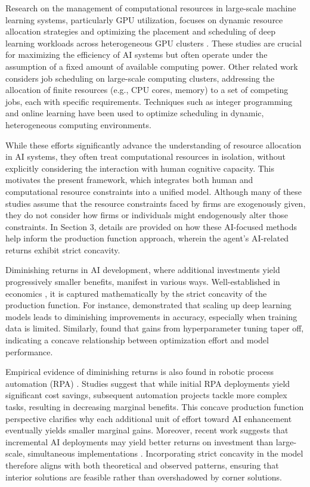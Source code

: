 \documentclass[11pt]{article}
\theoremstyle{definition}
\theoremstyle{remark}
\begin{document}
Research on the management of computational resources in large-scale machine learning systems, particularly GPU utilization, focuses on dynamic resource allocation strategies \citep{grandl2014multi} and optimizing the placement and scheduling of deep learning workloads across heterogeneous GPU clusters \citep{mirhosseini2017binochs}. These studies are crucial for maximizing the efficiency of AI systems but often operate under the assumption of a fixed amount of available computing power. Other related work considers job scheduling on large-scale computing clusters, addressing the allocation of finite resources (e.g., CPU cores, memory) to a set of competing jobs, each with specific requirements. Techniques such as integer programming \citep{mittal2013general} and online learning \citep{li2022optimizing} have been used to optimize scheduling in dynamic, heterogeneous computing environments.

While these efforts significantly advance the understanding of resource allocation in AI systems, they often treat computational resources in isolation, without explicitly considering the interaction with human cognitive capacity. This motivates the present framework, which integrates both human and computational resource constraints into a unified model. Although many of these studies assume that the resource constraints faced by firms are exogenously given, they do not consider how firms or individuals might endogenously alter those constraints. In Section 3, details are provided on how these AI-focused methods help inform the production function approach, wherein the agent’s AI-related returns exhibit strict concavity.

Diminishing returns in AI development, where additional investments yield progressively smaller benefits, manifest in various ways. Well-established in economics \citep{dixit1990optimization}, it is captured mathematically by the strict concavity of the production function. For instance, \cite{kaplan2020scaling} demonstrated that scaling up deep learning models leads to diminishing improvements in accuracy, especially when training data is limited. Similarly, \cite{snoek2012practical} found that gains from hyperparameter tuning taper off, indicating a concave relationship between optimization effort and model performance.

Empirical evidence of diminishing returns is also found in robotic process automation (RPA) \citep{syed2020robotic}. Studies suggest that while initial RPA deployments yield significant cost savings, subsequent automation projects tackle more complex tasks, resulting in decreasing marginal benefits. This concave production function perspective clarifies why each additional unit of effort toward AI enhancement eventually yields smaller marginal gains. Moreover, recent work suggests that incremental AI deployments may yield better returns on investment than large-scale, simultaneous implementations \citep{davenport2018artificial}. Incorporating strict concavity in the model therefore aligns with both theoretical and observed patterns, ensuring that interior solutions are feasible rather than overshadowed by corner solutions.
\end{document}
